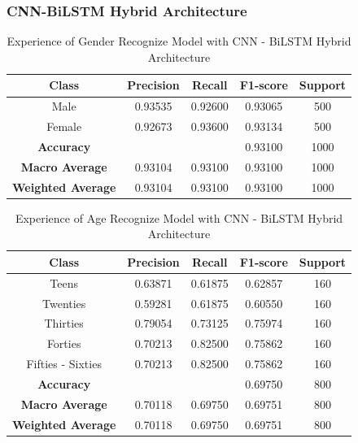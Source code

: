\documentclass[conference, 10pt,onecolumn]{IEEEtran}
\begin{document}
\subsubsection{CNN-BiLSTM Hybrid Architecture}

\begin{table}[htbp]
    \centering
    \begin{tabular}{|c|cccc|}
        \hline
        \textbf{Class} & \textbf{Precision} & \textbf{Recall} & \textbf{F1-score} & \textbf{Support} \\
        \hline
        Male & 0.93535 & 0.92600 & 0.93065 & 500 \\
        Female & 0.92673 & 0.93600 & 0.93134 & 500 \\
        \hline
        \textbf{Accuracy} & \multicolumn{2}{c}{} & 0.93100 & 1000 \\
        \textbf{Macro Average} & 0.93104 & 0.93100 & 0.93100 & 1000 \\
        \textbf{Weighted Average} & 0.93104 & 0.93100 & 0.93100 & 1000 \\
        \hline
    \end{tabular}
    \caption{Experience of Gender Recognize Model with CNN - BiLSTM Hybrid Architecture}
    \label{tab:Experience of Gender Recognize Model with CNN - BiLSTM Hybrid Architecture}
\end{table}

\begin{table}[htbp]
    \centering
    \begin{tabular}{|c|cccc|}
        \hline
        \textbf{Class} & \textbf{Precision} & \textbf{Recall} & \textbf{F1-score} & \textbf{Support} \\
        \hline
        Teens & 0.63871 & 0.61875 & 0.62857 & 160 \\
        Twenties & 0.59281 & 0.61875 & 0.60550 & 160 \\
        Thirties &  0.79054 & 0.73125 & 0.75974 & 160 \\
        Forties &   0.70213 & 0.82500 & 0.75862 & 160 \\
        Fifties - Sixties & 0.70213 & 0.82500 & 0.75862 & 160 \\
        \hline
        \textbf{Accuracy} &  &  & 0.69750 & 800 \\
        \textbf{Macro Average} & 0.70118 & 0.69750 & 0.69751 & 800 \\
        \textbf{Weighted Average} & 0.70118 & 0.69750 & 0.69751 & 800 \\
        \hline
    \end{tabular}
    \caption{Experience of Age Recognize Model with CNN - BiLSTM Hybrid Architecture}
    \label{tab:Experience of Age Recognize Model with CNN - BiLSTM Hybrid Architecture}
\end{table}
\end{document}

